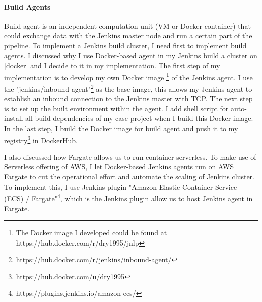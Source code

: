 \paragraph[]{Build Agents}
Build agent is an independent computation unit (VM or Docker container) that could exchange data with the Jenkins master node and run a certain part of the pipeline. To implement a Jenkins build cluster, I need first to implement build agents.
I discussed why I use Docker-based agent in my Jenkins build a cluster on \ref{docker} and I decide to it in my implementation. The first step of my implementation is to develop my own Docker image \footnote{The Docker image I developed could be found at https://hub.docker.com/r/dry1995/jnlp} of the Jenkins agent. I use the "jenkins/inbound-agent"\footnote{https://hub.docker.com/r/jenkins/inbound-agent/} as the base image, this allows my Jenkins agent to establish an inbound connection to the Jenkins master with TCP. The next step is to set up the built environment within the agent. I add shell script for auto-install all build dependencies of my case project when I build this Docker image. In the last step, I build the Docker image for build agent and push it to my registry\footnote{https://hub.docker.com/u/dry1995} in DockerHub. 
\par
I also discussed how Fargate allows us to run container serverless. To make use of Serverless offering of AWS, I let Docker-based Jenkins agents run on AWS Fargate to cut the operational effort and automate the scaling of Jenkins cluster. To implement this, I use Jenkins plugin "Amazon Elastic Container Service (ECS) / Fargate"\footnote{https://plugins.jenkins.io/amazon-ecs/}, which is the Jenkins plugin allow us to host Jenkins agent in Fargate.  
